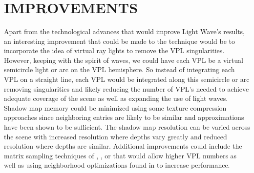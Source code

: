 \section{IMPROVEMENTS}
\paragraph{}
Apart from the technological advances that would improve Light Wave's results, an interesting improvement that could be made to the technique would be to incorporate the idea of virtual ray lights \cite{Novak2012} to remove the VPL singularities.  However, keeping with the spirit of waves, we could have each VPL be a virtual semicircle light or arc on the VPL hemisphere.  So instead of integrating each VPL on a straight line, each VPL would be integrated along this semicircle or arc removing singularities and likely reducing the number of VPL's needed to achieve adequate coverage of the scene as well as expanding the use of light waves.  Shadow map memory could be minimized using some texture compression approaches since neighboring entries are likely to be similar and approximations have been shown to be sufficient.  The shadow map resolution can be varied across the scene with increased resolution where depths vary greatly and reduced resolution where depths are similar.  Additional improvements could include the matrix sampling techniques of \cite{Havsan2007}, \cite{Ou2011}, or \cite{Walter2005a} that would allow higher VPL numbers as well as using neighborhood optimizations found in \cite{Dachsbacher2006} to increase performance.